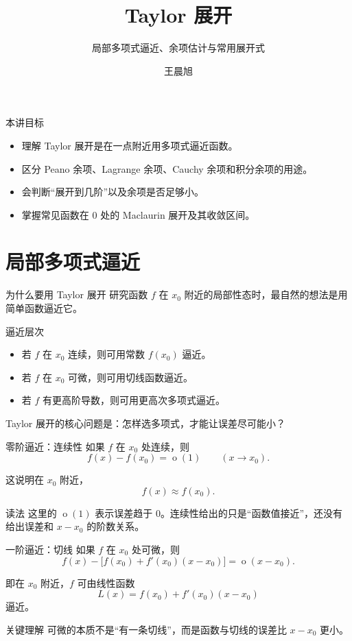 \documentclass[aspectratio=169,11pt]{ctexbeamer}
\title{Taylor 展开}
\subtitle{局部多项式逼近、余项估计与常用展开式}
\author{王晨旭}
\date{}
\newcommand{\ord}{\operatorname{o}}
\begin{document}
\begin{frame}
  \titlepage
\end{frame}

\begin{frame}{本讲目标}
\begin{itemize}
  \item 理解 Taylor 展开是在一点附近用多项式逼近函数。
  \item 区分 Peano 余项、Lagrange 余项、Cauchy 余项和积分余项的用途。
  \item 会判断“展开到几阶”以及余项是否足够小。
  \item 掌握常见函数在 $0$ 处的 Maclaurin 展开及其收敛区间。
\end{itemize}
\end{frame}

\section{局部多项式逼近}

\begin{frame}{为什么要用 Taylor 展开}
\small
研究函数 $f$ 在 $x_0$ 附近的局部性态时，最自然的想法是用简单函数逼近它。

\begin{block}{逼近层次}
\begin{itemize}
  \item 若 $f$ 在 $x_0$ 连续，则可用常数 $f(x_0)$ 逼近。
  \item 若 $f$ 在 $x_0$ 可微，则可用切线函数逼近。
  \item 若 $f$ 有更高阶导数，则可用更高次多项式逼近。
\end{itemize}
\end{block}

Taylor 展开的核心问题是：怎样选多项式，才能让误差尽可能小？
\end{frame}

\begin{frame}{零阶逼近：连续性}
\small
如果 $f$ 在 $x_0$ 处连续，则
\[
  f(x)-f(x_0)=\ord(1)\qquad (x\to x_0).
\]

这说明在 $x_0$ 附近，
\[
  f(x)\approx f(x_0).
\]

\begin{block}{读法}
这里的 $\ord(1)$ 表示误差趋于 $0$。连续性给出的只是“函数值接近”，还没有给出误差和 $x-x_0$ 的阶数关系。
\end{block}
\end{frame}

\begin{frame}{一阶逼近：切线}
\small
如果 $f$ 在 $x_0$ 处可微，则
\[
  f(x)-\bigl[f(x_0)+f'(x_0)(x-x_0)\bigr]
  =
  \ord(x-x_0).
\]

即在 $x_0$ 附近，$f$ 可由线性函数
\[
  L(x)=f(x_0)+f'(x_0)(x-x_0)
\]
逼近。

\begin{block}{关键理解}
可微的本质不是“有一条切线”，而是函数与切线的误差比 $x-x_0$ 更小。
\end{block}
\end{frame}
\end{document}
